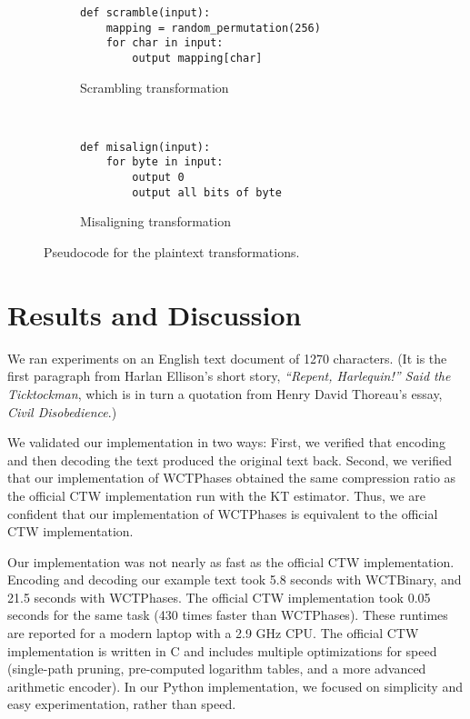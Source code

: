 \documentclass[11pt]{scrartcl}
\begin{document}
\begin{figure}[h!]
    \centering
    \begin{subfigure}[b]{0.45\textwidth}
\begin{verbatim}
def scramble(input):
    mapping = random_permutation(256)
    for char in input:
        output mapping[char] \end{verbatim}
        \caption{Scrambling transformation}
    \end{subfigure}
    ~
    \begin{subfigure}[b]{0.45\textwidth}
\begin{verbatim}
def misalign(input):
    for byte in input:
        output 0
        output all bits of byte \end{verbatim}
        \caption{Misaligning transformation}
    \end{subfigure}
    \caption{Pseudocode for the plaintext transformations.}
    \label{fig:transformations}
\end{figure}



\section{Results and Discussion}

We ran experiments on an English text document of 1270 characters. (It is the
first paragraph from Harlan Ellison's short story, {\em ``Repent, Harlequin!''
Said the Ticktockman}, which is in turn a quotation from Henry David Thoreau's
essay, {\em Civil Disobedience}.)

We validated our implementation in two ways: First, we verified that encoding
and then decoding the text produced the original text back. Second, we verified
that our implementation of WCTPhases obtained the same compression ratio as the
official CTW implementation run with the KT estimator. Thus, we are confident
that our implementation of WCTPhases is equivalent to the official CTW
implementation.

Our implementation was not nearly as fast as the official CTW implementation.
Encoding and decoding our example text took 5.8 seconds with WCTBinary, and
21.5 seconds with WCTPhases. The official CTW implementation took 0.05 seconds
for the same task (430 times faster than WCTPhases). These runtimes are
reported for a modern laptop with a 2.9 GHz CPU. The official CTW
implementation is written in C and includes multiple optimizations for speed
(single-path pruning, pre-computed logarithm tables, and a more advanced
arithmetic encoder). In our Python implementation, we focused on simplicity and
easy experimentation, rather than speed.
\end{document}
